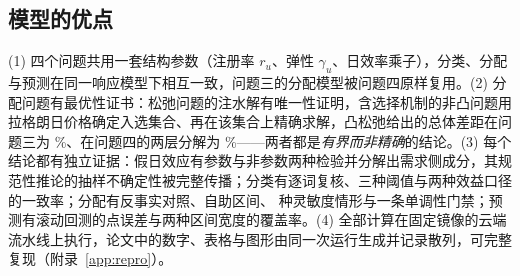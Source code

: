 \label{sec:evaluation}
\subsection{模型的优点}
(1) 四个问题共用一套结构参数（注册率 $r_u$、弹性 $\gamma_u$、日效率乘子），分类、分配与预测在同一响应模型下相互一致，问题三的分配模型被问题四原样复用。(2) 分配问题有最优性证书：松弛问题的注水解有唯一性证明，含选择机制的非凸问题用拉格朗日价格确定入选集合、再在该集合上精确求解，凸松弛给出的总体差距在问题三为 \valQthreeAggregateGapPct\%、在问题四的两层分解为 \valQfourJointGapPct\%——两者都是\emph{有界而非精确}的结论。(3) 每个结论都有独立证据：假日效应有参数与非参数两种检验并分解出需求侧成分，其规范性推论的抽样不确定性被完整传播；分类有逐词复核、三种阈值与两种效益口径的一致率；分配有反事实对照、自助区间、\valQthreeSensScenarios{} 种灵敏度情形与一条单调性门禁；预测有滚动回测的点误差与两种区间宽度的覆盖率。(4) 全部计算在固定镜像的云端流水线上执行，论文中的数字、表格与图形由同一次运行生成并记录散列，可完整复现（附录~\ref{app:repro}）。


